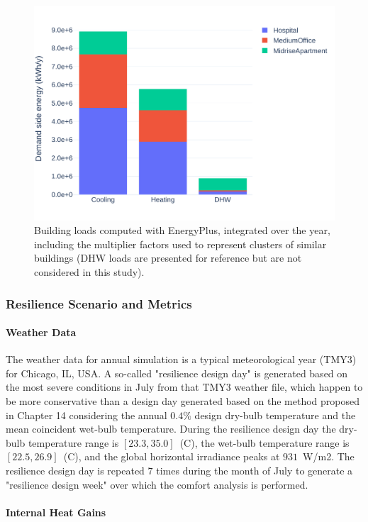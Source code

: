 \begin{figure}[!htbp]
    \centering
    \includegraphics[width=.7\linewidth]{../python_scripts/figures/LoadsSum.pdf}
    \caption{Building loads computed with EnergyPlus, integrated over the year, including the multiplier factors used to represent clusters of similar buildings (DHW loads are presented for reference but are not considered in this study).}
    \label{fig:loads}
\end{figure}


\subsubsection{Resilience Scenario and Metrics} \label{sec:resilience}

\paragraph{Weather Data} \label{par:weather}

The weather data for annual simulation is a typical meteorological year (TMY3) for Chicago, IL, USA.
A so-called "resilience design day" is generated based on the most severe conditions in July from that TMY3 weather file, which happen to be more conservative than a design day generated based on the method proposed in \cite{ASHRAE2017} Chapter 14 considering the annual $0.4\%$ design dry-bulb temperature and the mean coincident wet-bulb temperature.
During the resilience design day the dry-bulb temperature range is $[23.3, 35.0]$~(C), the wet-bulb temperature range is $[22.5, 26.9]$~(C), and the global horizontal irradiance peaks at $931$~W/m2.
The resilience design day is repeated $7$ times during the month of July to generate a "resilience design week" over which the comfort analysis is performed.

\paragraph{Internal Heat Gains} \label{par:heatgains}

